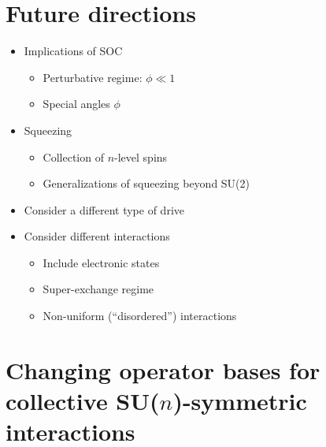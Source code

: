 \documentclass[nofootinbib,notitlepage,11pt]{revtex4-2}
\newcommand{\1}{\mathds{1}}
\begin{document}
\section{Future directions}

\begin{itemize}
\item Implications of SOC
  \begin{itemize}
  \item Perturbative regime: $\phi\ll1$
  \item Special angles $\phi$
  \end{itemize}
\item Squeezing
  \begin{itemize}
  \item Collection of $n$-level spins
  \item Generalizations of squeezing beyond SU(2)
  \end{itemize}
\item Consider a different type of drive
\item Consider different interactions
  \begin{itemize}
  \item Include electronic states
  \item Super-exchange regime
  \item Non-uniform (``disordered'') interactions
  \end{itemize}
\end{itemize}



\appendix

\section{Changing operator bases for collective SU($n$)-symmetric
  interactions}
\label{sec:changing_bases}
\end{document}
